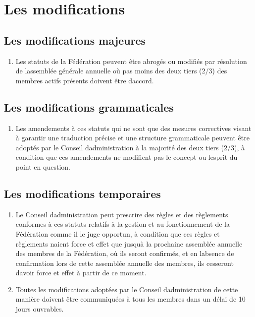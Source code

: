\section{Les modifications}
\label{les-modifications}

\subsection{Les modifications majeures}
\label{les-modifications-majeures}

\begin{enumerate}
 \item
  Les statuts de la Fédération peuvent être abrogés ou modifiés par résolution de l\textquotesingle assemblée générale annuelle où pas moins des deux tiers (2/3) des membres actifs présents doivent être d\textquotesingle accord.
\end{enumerate}

\subsection{Les modifications grammaticales}
\label{les-modifications-grammaticales}

\begin{enumerate}
 \item
  Les amendements à ces statuts qui ne sont que des mesures correctives visant à garantir une traduction précise et une structure grammaticale peuvent être adoptés par le Conseil d\textquotesingle administration à la majorité des deux tiers (2/3), à condition que ces amendements ne modifient pas le concept ou l\textquotesingle esprit du point en question.
\end{enumerate}

\subsection{Les modifications temporaires}
\label{les-modifications-temporaires}

\begin{enumerate}
 \item
  Le Conseil d\textquotesingle administration peut prescrire des règles et des règlements conformes à ces statuts relatifs à la gestion et au fonctionnement de la Fédération comme il le juge opportun, à condition que ces règles et règlements n\textquotesingle aient force et effet que jusqu\textquotesingle à la prochaine assemblée annuelle des membres de la Fédération, où ils seront confirmés, et en l\textquotesingle absence de confirmation lors de cette assemblée annuelle des membres, ils cesseront d\textquotesingle avoir force et effet à partir de ce moment.
 \item
  Toutes les modifications adoptées par le Conseil d\textquotesingle administration de cette manière doivent être communiquées à tous les membres dans un délai de 10 jours ouvrables.
\end{enumerate}

